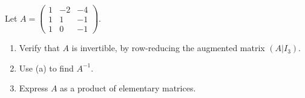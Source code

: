 \documentclass{eh-homework}
\begin{document}
    \begin{question}{2}
        Let \( A = \begin{pmatrix} 1 & -2 & -4 \\ 1 & 1 & -1 \\ 1 & 0 & -1 \end{pmatrix} \).

        \begin{enumerate}[label=(\alph*)]
            \item Verify that \( A \) is invertible, by row-reducing the augmented matrix \( (A | I_3) \).
            \item Use (a) to find \( A^{-1} \).
            \item Express \( A \) as a product of elementary matrices.
        \end{enumerate}
        \tcblower
        \ 
        

\end{question}
\end{document}
